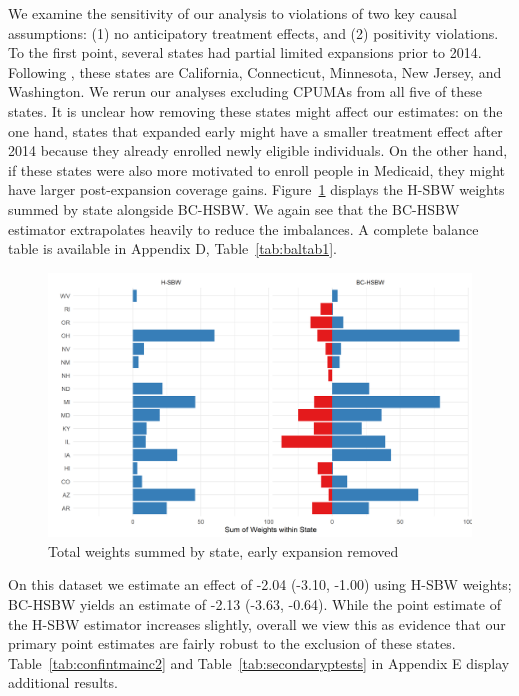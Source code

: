 \documentclass[aoas]{imsart}
\theoremstyle{plain}
\theoremstyle{remark}
\begin{document}
We examine the sensitivity of our analysis to violations of two key causal assumptions: (1) no anticipatory treatment effects, and (2) positivity violations. To the first point, several states had partial limited expansions prior to 2014. Following \cite{frean2017premium}, these states are California, Connecticut, Minnesota, New Jersey, and Washington. We rerun our analyses excluding CPUMAs from all five of these states. It is unclear how removing these states might affect our estimates: on the one hand, states that expanded early might have a smaller treatment effect after 2014 because they already enrolled newly eligible individuals. On the other hand, if these states were also more motivated to enroll people in Medicaid, they might have larger post-expansion coverage gains. Figure~\ref{fig:weightsbystatec2} displays the H-SBW weights summed by state alongside BC-HSBW. We again see that the BC-HSBW estimator extrapolates heavily to reduce the imbalances. A complete balance table is available in Appendix D, Table~\ref{tab:baltab1}.

\begin{figure}[H]
\begin{center}
    \caption{Total weights summed by state, early expansion removed}
    \label{fig:weightsbystatec2}
    \includegraphics[scale=0.6]{01_Plots/weights-by-state-hsbw-c2.png}
\end{center}
\end{figure}

On this dataset we estimate an effect of -2.04 (-3.10, -1.00) using H-SBW weights; BC-HSBW yields an estimate of -2.13 (-3.63, -0.64). While the point estimate of the H-SBW estimator increases slightly, overall we view this as evidence that our primary point estimates are fairly robust to the exclusion of these states. Table~\ref{tab:confintmainc2} and Table~\ref{tab:secondaryptests} in Appendix E display additional results. 
\end{document}
